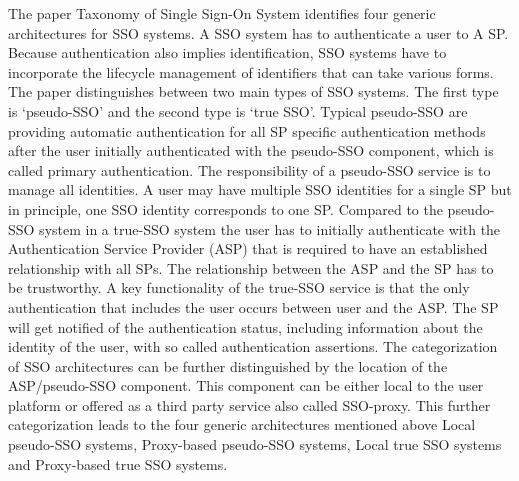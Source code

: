 {The paper Taxonomy of Single Sign-On System \cite{Pashalidis:2003:10.1007/3-540-45067-X_22} identifies four generic architectures for SSO systems. A SSO system has to authenticate a user to A SP. Because authentication also implies identification, SSO systems have to incorporate the lifecycle management of identifiers that can take various forms. The paper distinguishes between two main types of SSO systems. The first type is ‘pseudo-SSO’ and the second type is ‘true SSO’. Typical pseudo-SSO are providing automatic authentication for all SP specific authentication methods after the user initially authenticated with the pseudo-SSO component, which is called primary authentication. The responsibility of a pseudo-SSO service is to manage all identities. A user may have multiple SSO identities for a single SP but in principle, one SSO identity corresponds to one SP. Compared to the pseudo-SSO system in a true-SSO system the user has to initially authenticate with the Authentication Service Provider (ASP) that is required to have an established relationship with all SPs. The relationship between the ASP and the SP has to be trustworthy. A key functionality of the true-SSO service is that the only authentication that includes the user occurs between user and the ASP. The SP will get notified of the authentication status, including information about the identity of the user, with so called authentication assertions. The categorization of SSO architectures can be further distinguished by the location of the ASP/pseudo-SSO component. This component can be either local to the user platform or offered as a third party service also called SSO-proxy. This further categorization leads \cite{Pashalidis:2003:10.1007/3-540-45067-X_22} to the four generic architectures mentioned above Local pseudo-SSO systems, Proxy-based pseudo-SSO systems, Local true SSO systems and Proxy-based true SSO systems.

}
